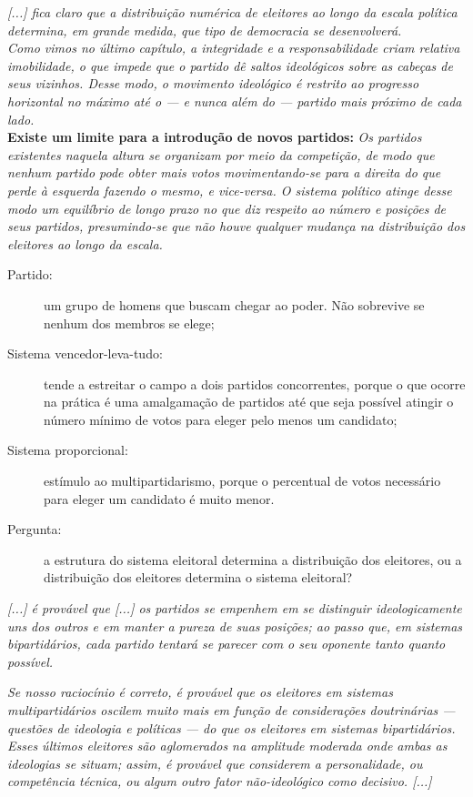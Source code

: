 \noindent \textit{[...] fica claro que a distribuição numérica de eleitores ao longo da escala política determina, em grande medida, que tipo de democracia se desenvolverá.} \cite[~p. 142-143]{downs} \\

\noindent \textit{Como vimos no último capítulo, a integridade e a responsabilidade criam relativa imobilidade, o que impede que o partido dê saltos ideológicos sobre as cabeças de seus vizinhos. Desse modo, o movimento ideológico é restrito ao progresso horizontal no máximo até o --- e nunca além do --- partido mais próximo de cada lado.} \cite[~p. 143]{downs} \\

\noindent \textbf{Existe um limite para a introdução de novos partidos:} \textit{Os partidos existentes naquela altura se organizam por meio da competição, de modo que nenhum partido pode obter mais votos movimentando-se para a direita do que perde à esquerda fazendo o mesmo, e vice-versa. O sistema político atinge desse modo um equilíbrio de longo prazo no que diz respeito ao número e posições de seus partidos, presumindo-se que não houve qualquer mudança na distribuição dos eleitores ao longo da escala.} \cite[~p. 144]{downs} 

\begin{description}
    \item [Partido:] um grupo de homens que buscam chegar ao poder. Não sobrevive se nenhum dos membros se elege;
    \item [Sistema vencedor-leva-tudo:] tende a estreitar o campo a dois partidos concorrentes, porque o que ocorre na prática é uma amalgamação de partidos até que seja possível atingir o número mínimo de votos para eleger pelo menos um candidato;
    \item [Sistema proporcional:] estímulo ao multipartidarismo, porque o percentual de votos necessário para eleger um candidato é muito menor.
    \item [Pergunta:] a estrutura do sistema eleitoral determina a distribuição dos eleitores, ou a distribuição dos eleitores determina o sistema eleitoral?
\end{description} 

\textit{[...] é provável que [...] os partidos se empenhem em se distinguir ideologicamente uns dos outros e em manter a pureza de suas posições; ao passo que, em sistemas bipartidários, cada partido tentará se parecer com o seu oponente tanto quanto possível.} 

\textit{Se nosso raciocínio é correto, é provável que os eleitores em sistemas multipartidários oscilem muito mais em função de considerações doutrinárias --- questões de ideologia e políticas --- do que os eleitores em sistemas bipartidários. Esses últimos eleitores são aglomerados na amplitude moderada onde ambas as ideologias se situam; assim, é provável que considerem a personalidade, ou competência técnica, ou algum outro fator não-ideológico como decisivo. [...]} 

